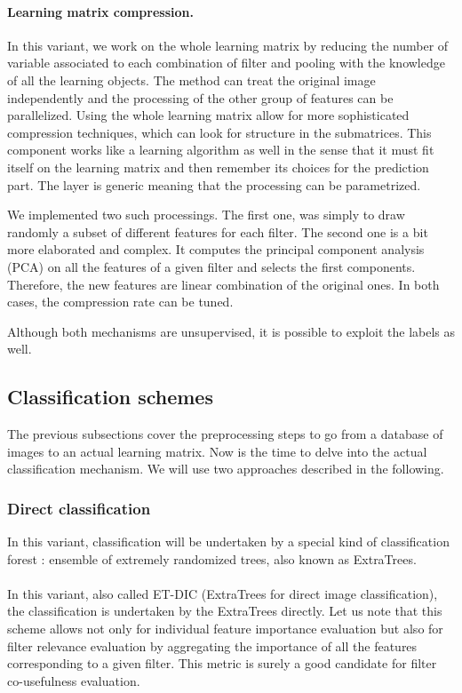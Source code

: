 \documentclass[a4paper]{report}
\begin{document}
		\paragraph{Learning matrix compression.}
		In this variant, we work on the whole learning matrix by reducing the number of variable associated to each combination of filter and pooling with the knowledge of all the learning objects. The method can treat the original image independently and the processing of the other group of features can be parallelized. Using the whole learning matrix allow for more sophisticated compression techniques, which can look for structure in the submatrices. This component works like a learning algorithm as well in the sense that it must fit itself on the learning matrix and then remember its choices for the prediction part.
		The layer is generic meaning that the processing can be parametrized.
		\par
		We implemented two such processings. The first one, was simply to draw randomly a subset of different features for each filter. The second one is a bit more elaborated and complex. It computes the principal component analysis (PCA) on all the features of a given filter and selects the first components. Therefore, the new features are linear combination of the original ones. In both cases, the compression rate can be tuned. 
		\par
		Although both mechanisms are unsupervised, it is possible to exploit the labels as well.
		
		\subsection{Classification schemes}
		The previous subsections cover the preprocessing steps to go from a database of images to an actual learning matrix. Now is the time to delve into the actual classification mechanism. We will use two approaches described in the following. 
		
			\subsubsection{Direct classification}
			In this variant, classification will be undertaken by a special kind of classification forest : ensemble of extremely randomized trees, also known as ExtraTrees.
			\paragraph{}
			In this variant, also called ET-DIC (ExtraTrees for direct image classification), the classification is undertaken by the ExtraTrees directly.
			Let us note that this scheme allows not only for individual feature importance evaluation but also for filter relevance evaluation by aggregating the importance of all the features corresponding to a given filter. This metric is surely a good candidate for filter co-usefulness evaluation.
\end{document}
